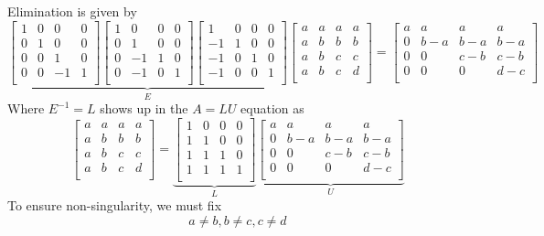 \documentclass[a4paper]{article}
\begin{document}
Elimination is given by
\tiny\[
	\underbrace{
	\begin{bmatrix}
		1 & 0 & 0 & 0 \\
		0 & 1 & 0 & 0 \\
		0 & 0 & 1 & 0 \\
		0 & 0 & -1 & 1 \\
	\end{bmatrix}
	\begin{bmatrix}
		1 & 0 & 0 & 0 \\
		0 & 1 & 0 & 0 \\
		0 & -1 & 1 & 0 \\
		0 & -1 & 0 & 1 \\
	\end{bmatrix}
	\begin{bmatrix}
		1 & 0 & 0 & 0 \\
		-1 & 1 & 0 & 0 \\
		-1 & 0 & 1 & 0 \\
		-1 & 0 & 0 & 1 \\
	\end{bmatrix}
	}_{E}
	\begin{bmatrix}
		a & a & a & a \\
		a & b & b & b \\
		a & b & c & c \\
		a & b & c & d \\
	\end{bmatrix}
	=
	\begin{bmatrix}
		a & a & a & a \\
		0 & b-a & b-a & b-a \\
		0 & 0 & c-b & c-b \\
		0 & 0 & 0 & d-c \\
	\end{bmatrix}
\]
\normalsize 
Where \(E^{-1} = L\) shows up in the \(A = LU\) equation as
\[
	\begin{bmatrix}
		a & a & a & a \\
		a & b & b & b \\
		a & b & c & c \\
		a & b & c & d \\
	\end{bmatrix}
	=
	\underbrace{
	\begin{bmatrix}
		1 & 0 & 0 & 0 \\
		1 & 1 & 0 & 0 \\
		1 & 1 & 1 & 0 \\
		1 & 1 & 1 & 1 \\
	\end{bmatrix}}_{L}
	\underbrace{
	\begin{bmatrix}
		a & a & a & a \\
		0 & b-a & b-a & b-a \\
		0 & 0 & c-b & c-b \\
		0 & 0 & 0 & d-c \\
	\end{bmatrix}}_{U}
\]
To ensure non-singularity, we must fix
\[
	a \neq b, b \neq c, c \neq d 
\]
\end{document}
